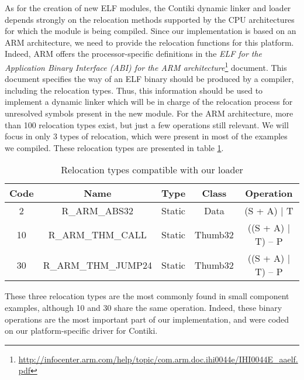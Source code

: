 As for the creation of new ELF modules, the Contiki dynamic linker and loader\cite{dunkels06runtime} depends strongly on the relocation methods supported by the CPU architectures for which the module is being compiled.
Since our implementation is based on an ARM architecture, we need to provide the relocation functions for this platform.
Indeed, ARM offers the processor-specific definitions in the \textit{ELF for the Application Binary Interface (ABI) for the ARM architecture}\footnote{\url{http://infocenter.arm.com/help/topic/com.arm.doc.ihi0044e/IHI0044E_aaelf.pdf}} document.
This document specifies the way of an ELF binary should be produced by a compiler, including the relocation types.
Thus, this information should be used to implement a dynamic linker which will be in charge of the relocation process for unresolved symbols present in the new module.
For the ARM architecture, more than 100 relocation types exist, but just a few operations still relevant.
We will focus in only 3 types of relocation, which were present in most of the examples we compiled.
These relocation types are presented in table \ref{tab:relocTypes}.

\begin{table}[htb]
	\centering
	\caption{Relocation types compatible with our loader}
	\label{tab:relocTypes}
	\begin{tabular}{|c|c|c|c|c|}
		\hline
		\textbf{Code} & \textbf{Name}       & \textbf{Type} & \textbf{Class} & \textbf{Operation} \\ \hline
		2             & R\_ARM\_ABS32       & Static        & Data           & (S + A) | T        \\ \hline
		10            & R\_ARM\_THM\_CALL   & Static        & Thumb32        & ((S + A) | T) – P  \\ \hline
		30            & R\_ARM\_THM\_JUMP24 & Static        & Thumb32        & ((S + A) | T) – P  \\ \hline
	\end{tabular}
\end{table}

These three relocation types are the most commonly found in small component examples, although 10 and 30 share the same operation.
Indeed, these binary operations are the most important part of our implementation, and were coded on our platform-specific driver for Contiki.


